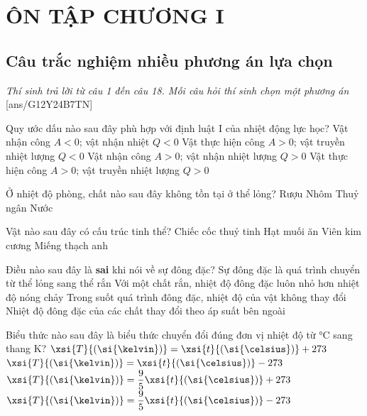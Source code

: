 \section*{ÔN TẬP CHƯƠNG I}
\subsection{Câu trắc nghiệm nhiều phương án lựa chọn}
\textit{Thí sinh trả lời từ câu 1 đến câu 18. Mỗi câu hỏi thí sinh chọn một phương án}
[ans/G12Y24B7TN]
\begin{ex}
	Quy ước dấu nào sau đây phù hợp với định luật I của nhiệt động lực học?
	\choice
	{Vật nhận công $A<0$; vật nhận nhiệt $Q<0$}
	{Vật thực hiện công $A>0$; vật truyền nhiệt lượng $Q<0$}
	{\True Vật nhận công $A>0$; vật nhận nhiệt lượng $Q>0$}
	{Vật thực hiện công $A>0$; vật truyền nhiệt lượng $Q>0$}
	\loigiai{}
\end{ex}
\begin{ex}
	Ở nhiệt độ phòng, chất nào sau đây không tồn tại ở thể lỏng?
	\choice
	{Rượu}
	{\True Nhôm}
	{Thuỷ ngân}
	{Nước}
	\loigiai{}
\end{ex}
\begin{ex}
	Vật nào sau đây có cấu trúc tinh thể?
	\choice
	{\True Chiếc cốc thuỷ tinh}
	{Hạt muối ăn}
	{Viên kim cương}
	{Miếng thạch anh}
	\loigiai{}
\end{ex}
\begin{ex}
Điều nào sau đây là \textbf{sai} khi nói về sự đông đặc?	
	\choice
	{Sự đông đặc là quá trình chuyển từ thể lỏng sang thể rắn}
	{\True Với một chất rắn, nhiệt độ đông đặc luôn nhỏ hơn nhiệt độ nóng chảy}
	{Trong suốt quá trình đông đặc, nhiệt độ của vật không thay đổi}
	{Nhiệt độ đông đặc của các chất thay đổi theo áp suất bên ngoài}
	\loigiai{}
\end{ex}
\begin{ex}
	Biểu thức nào sau đây là biểu thức chuyển đổi đúng đơn vị nhiệt độ từ $\si{\celsius}$ sang thang $\si{\kelvin}$?
	\choice
	{\True $\xsi{T}{\left(\si{\kelvin}\right)}=\xsi{t}{\left(\si{\celsius}\right)}+273$}
	{$\xsi{T}{\left(\si{\kelvin}\right)}=\xsi{t}{\left(\si{\celsius}\right)}-273$}
	{$\xsi{T}{\left(\si{\kelvin}\right)}=\dfrac{9}{5}\xsi{t}{\left(\si{\celsius}\right)}+273$}
	{$\xsi{T}{\left(\si{\kelvin}\right)}=\dfrac{9}{5}\xsi{t}{\left(\si{\celsius}\right)}-273$}
	\loigiai{}
\end{ex}
